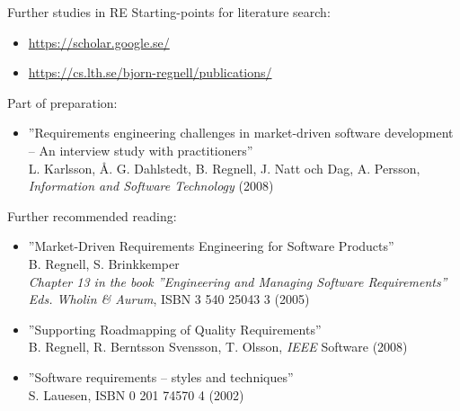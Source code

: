 \documentclass{simpleslides}
\begin{document}
\begin{frame}[fragile]{Further studies in RE}
  Starting-points for literature search:

\begin{itemize}\footnotesize
\item \url{https://scholar.google.se/}\\
\item \url{https://cs.lth.se/bjorn-regnell/publications/}\\
\end{itemize}

\vfill
Part of preparation:
\begin{itemize}\footnotesize
  \item ''Requirements engineering challenges in market-driven
  software development -- An interview study with practitioners'' \\ L. Karlsson, Å. G. Dahlstedt, B. Regnell, J. Natt och Dag, A. Persson, \emph{Information and Software Technology} (2008) 
\end{itemize}

  Further recommended reading: 
\begin{itemize}\footnotesize
  \item ''Market-Driven Requirements Engineering for Software Products'' \\ B. Regnell, S. Brinkkemper \\ \emph{Chapter 13 in the book ''Engineering and Managing Software Requirements'' Eds. Wholin \& Aurum},  ISBN 3 540 25043 3 (2005)
  \item ''Supporting Roadmapping of Quality Requirements'' \\ B. Regnell, R. Berntsson Svensson, T. Olsson, \emph{IEEE} Software (2008) 
  \item ''Software requirements -- styles and techniques'' \\ S. Lauesen, ISBN 0 201 74570 4  (2002) 
\end{itemize}

\end{frame}
\end{document}
